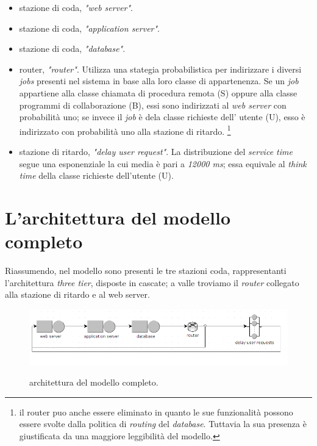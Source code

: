 \documentclass[../main.tex]{subfiles}
\begin{document}
    \begin{itemize}
        \item stazione di coda, \textit{"web server"}.
        \item stazione di coda, \textit{"application server"}.
        \item stazione di coda, \textit{"database"}.
        \item router, \textit{"router"}. Utilizza una stategia probabilistica per indirizzare i diversi \textit{jobs} presenti nel sistema in base alla loro classe di appartenenza.
        Se un \textit{job} appartiene alla classe chiamata di procedura remota (S) oppure alla classe programmi di collaborazione (B), essi sono indirizzati al \textit{web server} con probabilità uno;
        se invece il \textit{job} è dela classe richieste dell' utente (U), esso è indirizzato con probabilità uno alla stazione di ritardo. \footnote{il router puo anche essere eliminato in quanto le sue funzionalità possono essere svolte dalla politica di \textit{routing} del \textit{database}. Tuttavia la sua presenza è giustificata da una maggiore leggibilità del modello.}
        \item stazione di ritardo, \textit{"delay user request"}. La distribuzione del \textit{service time} segue una esponenziale la cui media è pari a \textit{12000 ms};
        essa equivale al \textit{think time} della classe richieste dell'utente (U).

    \end{itemize}


    \section{L'architettura del modello completo}\label{sec:l'architettura-del-modello-completo}
    Riassumendo, nel modello sono presenti le tre stazioni coda, rappresentanti l'architettura \textit{three tier}, disposte in cascate; a valle troviamo il \textit{router} collegato alla stazione di ritardo e al web server.

    \begin{figure}[H]
        \centering
        \includegraphics[scale = 0.6]{assets/modello_jsim}\\
        \caption[\textit{Architettura} del modello]{architettura del modello completo.}
        \label{fig:architettura-del-modello-completo}
    \end{figure}
\end{document}
